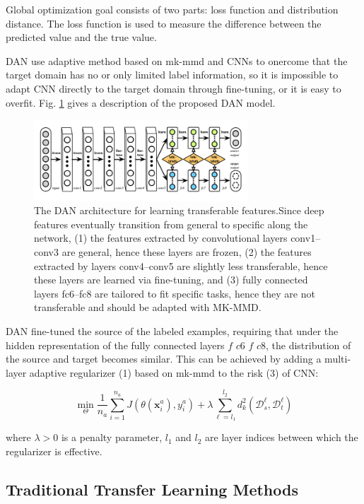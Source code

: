 \documentclass[conference]{IEEEtran}
\begin{document}
Global optimization goal consists of two parts: loss function and distribution distance. The loss function is used to measure the difference between the predicted value and the true value.

DAN use adaptive method based on mk-mmd and CNNs to onercome that the target domain has no or only limited label information, so it is impossible to adapt CNN directly to the target domain through fine-tuning, or it is easy to overfit. Fig. \ref{kFig2} gives a description of the proposed DAN model.

\begin{center}
	\begin{figure}[htbp]
		\centering
		\label{kFig2}
		\includegraphics[width=8cm]{image/DAN.png}
		\caption{The DAN architecture for learning transferable features.Since deep features eventually transition from general to specific along the network, (1) the features extracted by convolutional layers conv1–conv3 are general, hence these layers are frozen, (2) the features extracted by layers conv4–conv5 are slightly less transferable, hence these layers are learned via fine-tuning, and (3) fully connected layers fc6–fc8 are tailored to fit specific tasks, hence they are not transferable and should be adapted with MK-MMD.\cite{Long2015Learning}}
	\end{figure}
\end{center}

DAN fine-tuned the source of the labeled examples, requiring that under the hidden representation of the fully connected layers $f$ $c6$ $f$ $c8$, the distribution of the source and target becomes similar. This can be achieved by adding a multi-layer adaptive regularizer (1) based on mk-mmd to the risk (3) of CNN:

$$
\min _{\Theta} \frac{1}{n_{a}} \sum_{i=1}^{n_{a}} J\left(\theta\left(\mathbf{x}_{i}^{a}\right), y_{i}^{a}\right)+\lambda \sum_{\ell=l_{1}}^{l_{2}} d_{k}^{2}\left(\mathcal{D}_{s}^{\ell}, \mathcal{D}_{t}^{\ell}\right)
$$


where $\lambda > 0$ is a penalty parameter, $l_1$ and $l_2$ are layer indices between which the regularizer is effective.

\subsection{Traditional Transfer Learning Methods}
\end{document}
